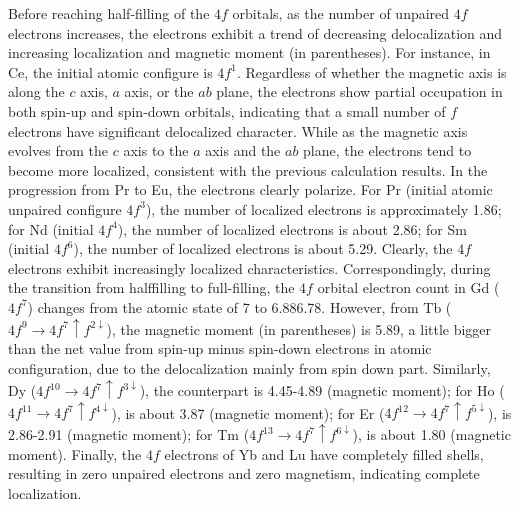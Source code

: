\documentclass[preprint,12pt]{elsarticle}
\begin{document}
Before reaching half-filling of the $4f$ orbitals, as the number of unpaired $4f$ electrons increases, the electrons exhibit a trend of decreasing delocalization and increasing localization and magnetic moment (in parentheses). For instance, in Ce, the initial atomic configure is $4f^1$. Regardless of whether the magnetic axis is along the $c$ axis, $a$ axis, or the $ab$ plane, the electrons show partial occupation in both spin-up and spin-down orbitals, indicating that a small number of $f$ electrons have significant delocalized character. While as the magnetic axis evolves from the $c$ axis to the $a$ axis and the $ab$ plane, the electrons tend to become more localized, consistent with the previous calculation results. In the progression from Pr to Eu, the electrons clearly polarize. For Pr (initial atomic unpaired configure $4f^3$), the number of localized electrons is approximately 1.86; for Nd (initial $4f^4$), the number of localized electrons is about 2.86; for Sm (initial $4f^6$), the number of localized electrons is about 5.29. Clearly, the $4f$ electrons exhibit increasingly localized characteristics. Correspondingly, during the transition from halffilling to full-filling, the $4f$ orbital electron count in Gd ($4f^7$) changes from the atomic state of 7 to 6.886.78. However, from Tb ($4f^9 \rightarrow 4f^7 \uparrow f^{2 \downarrow}$), the magnetic moment (in parentheses) is 5.89, a little bigger than the net value from spin-up minus spin-down electrons in atomic configuration, due to the delocalization mainly from spin down part. Similarly, Dy ($4f^{10} \rightarrow 4f^7 \uparrow f^{3 \downarrow}$), the counterpart is 4.45-4.89 (magnetic moment); for Ho ($4f^{11} \rightarrow 4f^7 \uparrow f^{4 \downarrow}$), is about 3.87 (magnetic moment); for Er ($4f^{12} \rightarrow 4f^7 \uparrow f^{5 \downarrow}$), is 2.86-2.91 (magnetic moment); for Tm ($4f^{13} \rightarrow 4f^7 \uparrow f^{6 \downarrow}$), is about 1.80 (magnetic moment). Finally, the $4f$ electrons of Yb and Lu have completely filled shells, resulting in zero unpaired electrons and zero magnetism, indicating complete localization.
\end{document}
